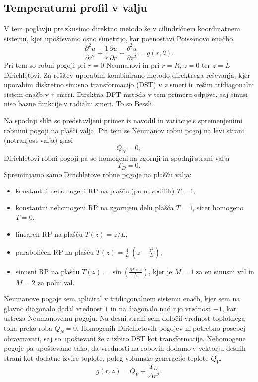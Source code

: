\subsection{Temperaturni profil v valju}

V tem poglavju preizkusimo direktno metodo še v cilindričnem koordinatnem sistemu, kjer upoštevamo osno simetrijo, kar poenostavi Poissonovo enačbo,
\begin{equation}
    \frac{\partial^2 u}{\partial r^2} + \frac{1}{r} \frac{\partial u}{\partial r} + \frac{\partial^2 u}{\partial z^2} = g(r,\theta).
\end{equation}
Pri tem so robni pogoji pri $r=0$ Neumanovi in pri $r=R$, $z=0$ ter $z=L$ Dirichletovi. Za rešitev uporabim kombinirano metodo direktnega reševanja, kjer uporabim diskretno sinusno transformacijo (DST) v $z$ smeri in rešim tridiagonalni sistem enačb v $r$ smeri. Direktna DFT metoda v tem primeru odpove, saj sinusi niso bazne funkcije v radialni smeri. To so Bessli.

Na spodnji sliki so predstavljeni primer iz navodil in variacije s spremenjenimi robnimi pogoji na plašči valja. Pri tem se Neumanov robni pogoj na levi strani (notranjost valja) glasi
\begin{equation}
    Q_N=0,
\end{equation}
Dirichletovi robni pogoji pa so homogeni na zgornji in spodnji strani valja
\begin{equation}
    T_{D}=0.
\end{equation}
Spreminjamo samo Dirichletove robne pogoje na plašču valja:
\begin{itemize}
    \item konstantni nehomogeni RP na plašču (po navodilih) $T=1$,
    \item konstantni nehomogeni RP na zgornjem delu plašča $T=1$, sicer homogeno $T=0$,
    \item linearen RP na plašču $T(z)=z/L$,
    \item paraboličen RP na plašču $T(z)=\frac{4}{L}\;\left(z-\frac{z^2}{L}\right)$,
    \item sinusni RP na plašču $T(z)=\sin{\left(\frac{M\;\pi\;z}{L}\right)}$, kjer je $M=1$ za en sinusni val in $M=2$ za polni val.
\end{itemize}

Neumanove pogoje sem apliciral v tridiagonalnem sistemu enačb, kjer sem na glavno diagonalo dodal vrednost $1$ in na diagonalo nad njo vrednost $-1$, kar ustreza Neumanovemu pogoju. Na desni strani sem določil vrednost toplotnega toka preko roba $Q_N=0$. Homogenih Dirichletovih pogojev ni potrebno posebej obravnavati, saj so upoštevani že z izbiro DST kot transformacije. Nehomogene pogoje pa upoštevamo tako, da vrednosti na robovih dodamo v vektorju desnih strani kot dodatne izvire toplote, poleg volumske generacije toplote $Q_V$,
\begin{equation}
    g(r,z) = Q_V + \frac{T_D}{\Delta r^2}.
\end{equation}

